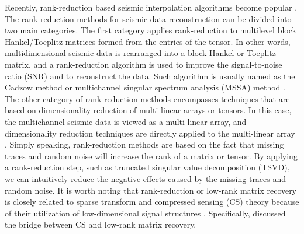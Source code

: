 Recently, rank-reduction based seismic interpolation algorithms become popular \cite[]{trickett2009,mssa,jianjun2015}.  The rank-reduction methods for seismic data reconstruction can be divided into two main categories. The first category applies rank-reduction to multilevel block Hankel/Toeplitz matrices formed from the entries of the tensor. In other words, multidimensional seismic data is rearranged into a block Hankel or Toeplitz matrix, and a rank-reduction algorithm is used to improve the signal-to-noise ratio (SNR) and to reconstruct the data. Such algorithm is usually named as the Cadzow method \cite[]{trickett2009} or multichannel singular spectrum analysis (MSSA) method \cite[]{mssa,weilin2015,weilin}. The other category of rank-reduction methods encompasses techniques that are based on dimensionality reduction of multi-linear arrays or tensors. In this case, the multichannel seismic data is viewed as a multi-linear array, and dimensionality reduction techniques are directly applied to the multi-linear array \cite[]{jianjun2015}. Simply speaking, rank-reduction methods are based on the fact that missing traces and random noise will increase the rank of a matrix or tensor. By applying a rank-reduction step, such as truncated singular value decomposition (TSVD), we can intuitively reduce the negative effects caused by the missing traces and random noise. It is worth noting that rank-reduction or low-rank matrix recovery is closely related to sparse transform and compressed sensing (CS) theory because of their utilization of low-dimensional signal structures \cite[]{recht,power,Yaniv}. Specifically, \cite{recht} discussed the bridge between CS and low-rank matrix recovery.  

